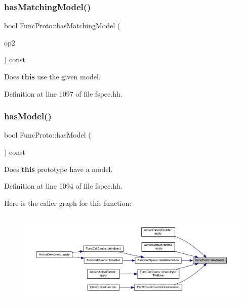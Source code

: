 \subsubsection{\texorpdfstring{hasMatchingModel()}{hasMatchingModel()}\hspace{0.1cm}{\footnotesize\ttfamily [2/2]}}
{\footnotesize\ttfamily bool Func\+Proto\+::has\+Matching\+Model (\begin{DoxyParamCaption}\item[{const \mbox{\hyperlink{class_proto_model}{Proto\+Model}} $\ast$}]{op2 }\end{DoxyParamCaption}) const\hspace{0.3cm}{\ttfamily [inline]}}



Does {\bfseries{this}} use the given model. 



Definition at line 1097 of file fspec.\+hh.

\mbox{\label{class_func_proto_a6ccc21837d768462cd2abca84a5ffd59}} 
\subsubsection{\texorpdfstring{hasModel()}{hasModel()}}
{\footnotesize\ttfamily bool Func\+Proto\+::has\+Model (\begin{DoxyParamCaption}\item[{void}]{ }\end{DoxyParamCaption}) const\hspace{0.3cm}{\ttfamily [inline]}}



Does {\bfseries{this}} prototype have a model. 



Definition at line 1094 of file fspec.\+hh.

Here is the caller graph for this function\+:
\nopagebreak
\begin{figure}[H]
\begin{center}
\leavevmode
\includegraphics[width=350pt]{class_func_proto_a6ccc21837d768462cd2abca84a5ffd59_icgraph}
\end{center}
\end{figure}
\mbox{\label{class_func_proto_ace0306cd7ee2a040dd783bd5e7606370}} 
